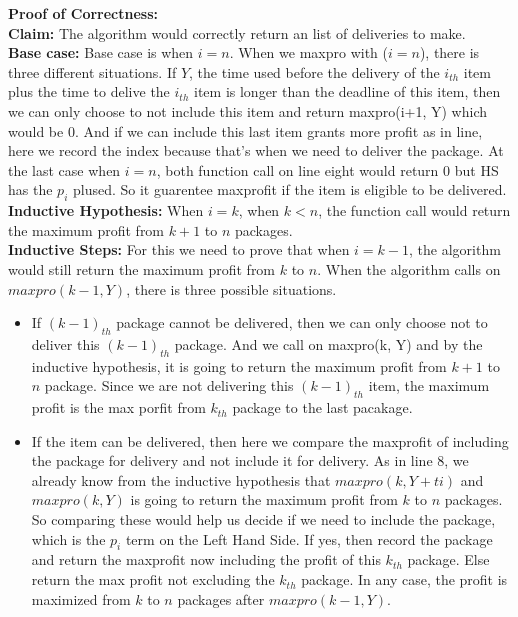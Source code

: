 \documentclass[14pt]{article}
\begin{document}
\begin{enumerate}
    \textbf{Proof of Correctness:}\\
    \textbf{Claim:} The algorithm would correctly return an list of deliveries 
    to make.\\
    \textbf{Base case:} Base case is when $i = n$. When we maxpro with ($i = n$),
    there is three different situations. If $Y$, the time used before the delivery
    of the $i_{th}$ item plus the time to delive the $i_{th}$ item is longer than
    the deadline of this item, then we can only choose to not include this item and
    return maxpro(i+1, Y) which would be 0. And if we can include this last item 
    grants more profit as in line, here we record the index because that's when
    we need to deliver the package. At the last case when $i =n$, both function
    call on line eight would return 0 but HS has the $p_i$ plused. So it guarentee
    maxprofit if the item is eligible to be delivered.\\
    \textbf{Inductive Hypothesis:} 
    When $i = k$, when $k < n$, the function call would return the maximum profit 
    from $k+1$ to $n$ packages.\\
    \textbf{Inductive Steps:} For this we need to prove that when $i = k-1$, the 
    algorithm would still return the maximum profit from $k$ to $n$. When the
    algorithm calls on $maxpro(k-1, Y)$, there is three possible situations.
  \begin{itemize}
   \item If $(k-1)_{th}$ package cannot be delivered, then we can only choose not
   to deliver this $(k-1)_{th}$ package. And we call on maxpro(k, Y) and by the
   inductive hypothesis, it is going to return the maximum profit from $k+1$ to
   $n$ package. Since we are not delivering this $(k-1)_{th}$ item, the maximum 
   profit is the max porfit from $k_{th}$ package to the last pacakage.
   \item If the item can be delivered, then here we compare the maxprofit of including
   the package for delivery and not include it for delivery. As in line 8, we already
   know from the inductive hypothesis that $maxpro(k, Y+ti)$ and $maxpro(k, Y)$ is
   going to return the maximum profit from $k$ to $n$ packages. So comparing these
   would help us decide if we need to include the package, which is the $p_i$ term
   on the Left Hand Side. If yes, then record the package and return the 
   maxprofit now including the profit of this $k_{th}$ package. Else return the max profit
   not excluding the $k_{th}$ package. In any case, the profit is maximized from
   $k$ to $n$ packages after $maxpro(k-1,Y)$.

\end{itemize}
\end{enumerate}
\end{document}

